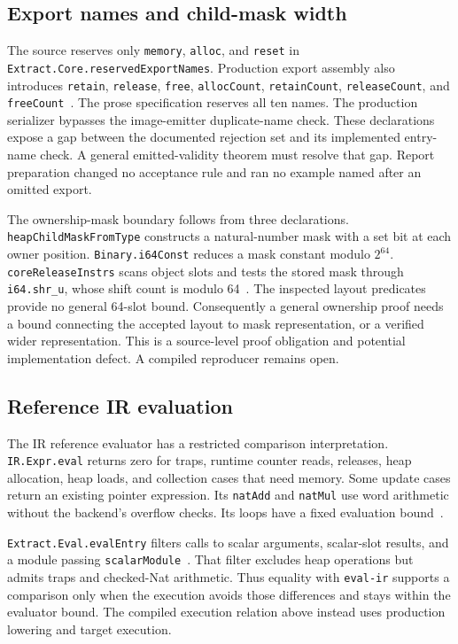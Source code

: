 \documentclass[11pt]{article}
\newcommand{\code}[1]{\texttt{#1}}
\begin{document}
\subsection{Export names and child-mask width}

The source reserves only \code{memory}, \code{alloc}, and \code{reset} in \code{Extract.Core.reservedExportNames}.  Production export assembly also introduces \code{retain}, \code{release}, \code{free}, \code{allocCount}, \code{retainCount}, \code{releaseCount}, and \code{freeCount}~\cite{extract,binary}.  The prose specification reserves all ten names.  The production serializer bypasses the image-emitter duplicate-name check.  These declarations expose a gap between the documented rejection set and its implemented entry-name check.  A general emitted-validity theorem must resolve that gap.  Report preparation changed no acceptance rule and ran no example named after an omitted export.

The ownership-mask boundary follows from three declarations.  \code{heapChildMaskFromType} constructs a natural-number mask with a set bit at each owner position.  \code{Binary.i64Const} reduces a mask constant modulo $2^{64}$.  \code{coreReleaseInstrs} scans object slots and tests the stored mask through \code{i64.shr\_u}, whose shift count is modulo 64~\cite{values,binary,wasm}.  The inspected layout predicates provide no general 64-slot bound.  Consequently a general ownership proof needs a bound connecting the accepted layout to mask representation, or a verified wider representation.  This is a source-level proof obligation and potential implementation defect.  A compiled reproducer remains open.

\subsection{Reference IR evaluation}

The IR reference evaluator has a restricted comparison interpretation.  \code{IR.Expr.eval} returns zero for traps, runtime counter reads, releases, heap allocation, heap loads, and collection cases that need memory.  Some update cases return an existing pointer expression.  Its \code{natAdd} and \code{natMul} use word arithmetic without the backend's overflow checks.  Its loops have a fixed evaluation bound~\cite{ir}.

\code{Extract.Eval.evalEntry} filters calls to scalar arguments, scalar-slot results, and a module passing \code{scalarModule}~\cite{ireval}.  That filter excludes heap operations but admits traps and checked-Nat arithmetic.  Thus equality with \code{eval-ir} supports a comparison only when the execution avoids those differences and stays within the evaluator bound.  The compiled execution relation above instead uses production lowering and target execution.
\end{document}
